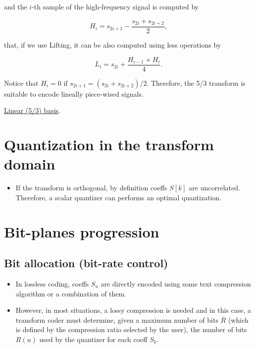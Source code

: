 and the $i$-th sample of the high-frequency signal is computed by

\begin{equation}
  H_i=s_{2i+1}-\frac{s_{2i}+s_{2i+2}}{2},
  \tag{5/3H}
  \label{eq:Lineal_A-HPF}
\end{equation}

that, if we use Lifting, it can be also computed using less operations by

\begin{equation}
  L_i=s_{2i}+\frac{H_{i-1}+H_i}{4}.
  \tag{5/3LLifted}
  \label{eq:Lineal_A-LPF_lifting}
\end{equation}

Notice that $H_i=0$ if $s_{2i+1}=(s_{2i}+s_{2i+2})/2$. Therefore, the 5/3 transform is suitable to encode lineally piece-wised signals.

\href{https://nbviewer.jupyter.org/github/vicente-gonzalez-ruiz/image_transformations_for_coding/blob/master/linear_2d_basis.ipynb}{Linear (5/3) basis}.

\section{Quantization in the transform domain}
\begin{itemize}
\tightlist
\item
  If the transform is orthogonal, by definition coeffs \(S[k]\) are
  uncorrelated. Therefore, a scalar quantizer can performs an optimal
  quantization.
\end{itemize}

\section{Bit-planes progression}

\subsection{Bit allocation (bit-rate control)}
\begin{itemize}
\item
  In lossless coding, coeffs \(S_u\) are directly encoded using some
  text compression algorithm or a combination of them.
\item
  However, in most situations, a lossy compression is needed and in this
  case, a transform coder must determine, given a maximum number of bits
  \(\overline{R}\) (which is defined by the compression ratio selected
  by the user), the number of bits \(R(u)\) used by the quantizer for
  each coeff \(S_k\).
\end{itemize}

